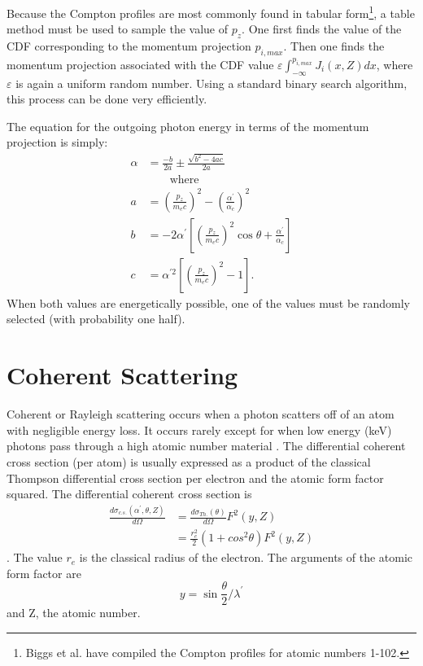 Because the Compton profiles are most commonly found in tabular form\footnote{Biggs et al. have compiled the Compton profiles for atomic numbers 1-102\citep{biggs_hartree-fock_1975}.}, a table method must be used to sample the value of 
$p_z$. One first finds the value of the CDF corresponding to the momentum 
projection $p_{i,max}$. Then one finds the momentum projection associated with 
the CDF value $\varepsilon\int_{-\infty}^{p_{i,max}}J_i(x,Z)dx$, where $\varepsilon$ 
is again a uniform random number. Using a standard binary search algorithm, 
this process can be done very efficiently.

The equation for the outgoing photon energy in terms of the momentum projection
is simply: 
\begin{align}
  \alpha & = \frac{-b}{2a} \pm \frac{\sqrt{b^2 - 4ac}}{2a} \\
  & \qquad \text{where} \nonumber \\
  a & = \left(\frac{p_z}{m_ec}\right)^2 - 
  \left(\frac{\alpha^{'}}{\alpha_c}\right)^2
  \nonumber \\
  b & = -2\alpha^{'}\left[\left(\frac{p_z}{m_ec}\right)^2\cos{\theta} + 
  \frac{\alpha^{'}}{\alpha_c}\right] \nonumber \\
  c & = \alpha^{'2}\left[\left(\frac{p_z}{m_ec}\right)^2 - 1\right]. \nonumber
\end{align}
When both values are energetically possible, one of the values must be randomly 
selected (with probability one half).

\section{Coherent Scattering}
\label{sec:coherent_scattering}
Coherent or Rayleigh scattering occurs when a photon scatters off of an atom 
with negligible energy loss. It occurs rarely except for when low energy (keV)
photons pass through a high atomic number material \citep{lux_monte_1991}. The 
differential coherent cross section (per atom) is usually expressed as a 
product of the classical Thompson differential cross section per electron and 
the atomic form factor squared. The differential coherent cross section is 
\begin{align}
  \frac{d\sigma_{c.s.}(\alpha^{'},\theta,Z)}{d\Omega} & = 
  \frac{d\sigma_{Th.}(\theta)}{d\Omega}F^2(y,Z) \nonumber \\
  & = \frac{r_e^2}{2}(1 + cos^2\theta)F^2(y,Z)
\end{align}
\citep{lux_monte_1991}. The value $r_e$ is the classical radius of the electron.
The arguments of the atomic form factor
are 
\begin{equation}
  y = \sin{\frac{\theta}{2}}/\lambda^{'}
\end{equation} 
and Z, the atomic number. 

